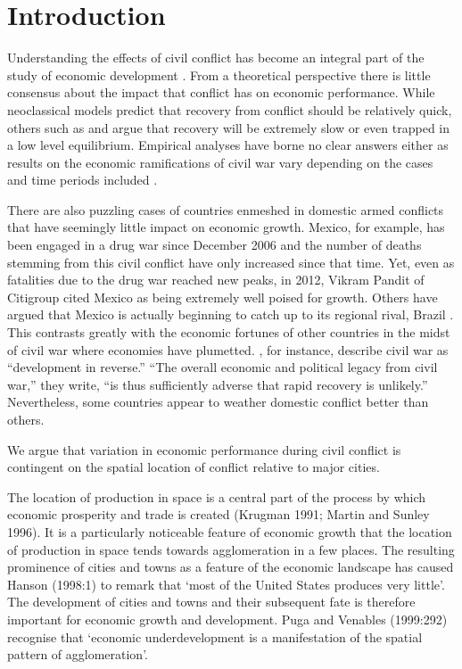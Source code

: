 \section{Introduction}
\label{intro}

Understanding the effects of civil conflict has become an integral part of the study of economic development \citep{serneels:verpoorten:2013}. From a theoretical perspective there is little consensus about the impact that conflict has on economic performance. While neoclassical models predict that recovery from conflict should be relatively quick, others such as \citet{barro:martin:2004} and \citet{sachs:2006} argue that recovery will be extremely slow or even trapped in a low level equilibrium. Empirical analyses have borne no clear answers either as results on the economic ramifications of civil war vary depending on the cases and time periods included \citep{kang:meernik:2005}. 

There are also puzzling cases of countries enmeshed in domestic armed conflicts that have seemingly little impact on economic growth. Mexico, for example, has been engaged in a drug war since December 2006 and the number of deaths stemming from this civil conflict have only increased since that time. Yet, even as fatalities due to the drug war reached new peaks, in 2012, Vikram Pandit of Citigroup cited Mexico as being extremely well poised for growth. Others have argued that Mexico is actually beginning to catch up to its regional rival, Brazil \citep{vardi:2012}. This contrasts greatly with the economic fortunes of other countries in the midst of civil war where economies have plumetted. \cite{collier:elliott:etal:2003}, for instance, describe civil war as ``development in reverse.''  ``The overall economic and political legacy from civil war,'' they write, ``is thus sufficiently adverse that rapid recovery is unlikely.''  Nevertheless, some countries appear to weather domestic conflict better than others.  


We argue that variation in economic performance during civil conflict is contingent on the spatial location of conflict relative to major cities. 

The location of production in space is a central part of the process by which economic 
prosperity and trade is created (Krugman 1991; Martin and Sunley 1996). It is a 
particularly noticeable feature of economic growth that the location of production in space 
tends towards agglomeration in a few places. The resulting prominence of cities and towns 
as a feature of the economic landscape has caused Hanson (1998:1) to remark that ‘most of 
the United States produces very little’. The development of cities and towns and their 
subsequent fate is therefore important for economic growth and development. Puga and 
Venables (1999:292) recognise that ‘economic underdevelopment is a manifestation of the 
spatial pattern of agglomeration’.

